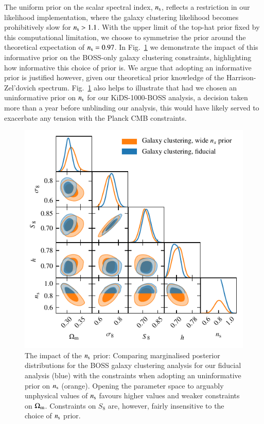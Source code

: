 \begin{appendix}
The uniform prior on the scalar spectral index, $n_{\rm s}$, reflects a restriction in our likelihood implementation, where the \citet{sanchez/etal:2017} galaxy clustering likelihood becomes prohibitively slow for $n_{\rm s}>1.1$.  With the upper limit of the top-hat prior fixed by this computational limitation, we choose to symmetrise the prior around the theoretical expectation of $n_{\rm s}=0.97$.     In Fig.~\ref{fig:ns-prior} we demonstrate the impact of this informative prior on the BOSS-only galaxy clustering constraints, highlighting how informative this choice of prior is.   We argue that adopting an informative prior is justified however, given our theoretical prior knowledge of the Harrison-Zel'dovich spectrum.   Fig.~\ref{fig:ns-prior} also helps to illustrate that had we chosen an uninformative prior on $n_{\rm s}$ for our KiDS-1000-BOSS analysis, a decision taken more than a year before unblinding our analysis, this would have likely served to exacerbate any tension with the Planck CMB constraints. 

\begin{figure}
	\begin{center}
		\includegraphics[width=\columnwidth]{Parameter_Plots/systematics/GC_ns_prior}
		\caption{The impact of the $n_{\rm s}$ prior: Comparing marginalised posterior distributions for the BOSS galaxy clustering analysis for our fiducial analysis (blue) with the constraints when adopting an uninformative prior on $n_{\rm s}$ (orange).   Opening the parameter space to arguably unphysical values of $n_{\rm s}$ favours higher values and weaker constraints on $\Omega_{\rm m}$. Constraints on $S_8$ are, however, fairly insensitive to the choice of $n_{\rm s}$ prior.}
		\label{fig:ns-prior}
	\end{center}
\end{figure}


\end{appendix}
